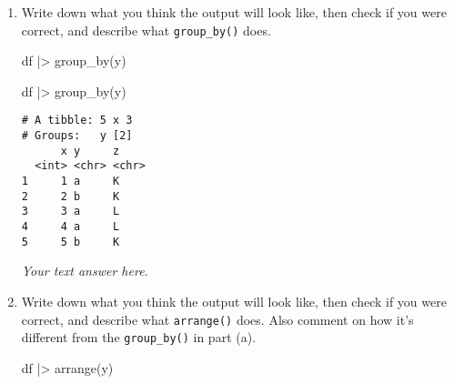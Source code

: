 \documentclass[
  letterpaper,
  DIV=11,
  numbers=noendperiod]{scrreprt}
\newenvironment{Shaded}{\begin{snugshade}}{\end{snugshade}}
\newcommand{\FunctionTok}[1]{\textcolor[rgb]{0.28,0.35,0.67}{#1}}
\newcommand{\NormalTok}[1]{\textcolor[rgb]{0.00,0.23,0.31}{#1}}
\newcommand{\SpecialCharTok}[1]{\textcolor[rgb]{0.37,0.37,0.37}{#1}}
\begin{document}
\begin{enumerate}
\def\labelenumi{\alph{enumi}.}
\item
  Write down what you think the output will look like, then check if you
  were correct, and describe what \texttt{group\_by()} does.

\begin{Shaded}
\begin{Highlighting}[]
\NormalTok{df }\SpecialCharTok{|\textgreater{}}
  \FunctionTok{group\_by}\NormalTok{(y)}
\end{Highlighting}
\end{Shaded}

  \begin{tcolorbox}[enhanced jigsaw, breakable, bottomtitle=1mm, left=2mm, colback=white, toprule=.15mm, leftrule=.75mm, colframe=quarto-callout-note-color-frame, colbacktitle=quarto-callout-note-color!10!white, title={Answer}, coltitle=black, toptitle=1mm, bottomrule=.15mm, opacitybacktitle=0.6, arc=.35mm, rightrule=.15mm, titlerule=0mm, opacityback=0]

\begin{Shaded}
\begin{Highlighting}[]
\NormalTok{df }\SpecialCharTok{|\textgreater{}}
  \FunctionTok{group\_by}\NormalTok{(y)}
\end{Highlighting}
\end{Shaded}

\begin{verbatim}
# A tibble: 5 x 3
# Groups:   y [2]
      x y     z    
  <int> <chr> <chr>
1     1 a     K    
2     2 b     K    
3     3 a     L    
4     4 a     L    
5     5 b     K    
\end{verbatim}

  \emph{Your text answer here.}

  \end{tcolorbox}
\item
  Write down what you think the output will look like, then check if you
  were correct, and describe what \texttt{arrange()} does. Also comment
  on how it's different from the \texttt{group\_by()} in part (a).

\begin{Shaded}
\begin{Highlighting}[]
\NormalTok{df }\SpecialCharTok{|\textgreater{}}
  \FunctionTok{arrange}\NormalTok{(y)}
\end{Highlighting}
\end{Shaded}

  \begin{tcolorbox}[enhanced jigsaw, breakable, bottomtitle=1mm, left=2mm, colback=white, toprule=.15mm, leftrule=.75mm, colframe=quarto-callout-note-color-frame, colbacktitle=quarto-callout-note-color!10!white, title={Answer}, coltitle=black, toptitle=1mm, bottomrule=.15mm, opacitybacktitle=0.6, arc=.35mm, rightrule=.15mm, titlerule=0mm, opacityback=0]


\end{tcolorbox}
\end{enumerate}
\end{document}
